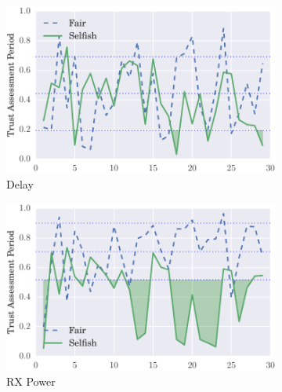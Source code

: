 \documentclass[runningheads,a4paper]{llncs}
\begin{document}
\begin{figure}
\begin{subfigure}{0.32\textwidth}
  \centering
  \includegraphics[width=.95\linewidth]{img/trust_bella_single_mobile_emph_ADelay_BadMouthingPowerControl.pdf}
  \caption{Delay}
  \label{fig:single_mobile_badmouthing_delay}
\end{subfigure}
\begin{subfigure}{0.32\textwidth}
\centering
  \includegraphics[width=.95\linewidth]{img/trust_bella_single_mobile_emph_ARXP_BadMouthingPowerControl.pdf}
  \caption{RX Power}
  \label{fig:single_mobile_badmouthing_rxp}
\end{subfigure}
\begin{subfigure}{0.32\textwidth}
\centering

\end{subfigure}
\end{figure}
\end{document}
